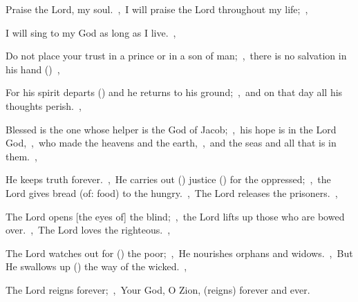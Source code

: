 \documentclass[12pt,twoside,a5paper]{article}
\begin{document}

\begin{normalparskip}
  Praise the Lord, my soul.~\sep\ I will praise the Lord throughout my life;~\sep


  I will sing to my God as long as I live.~\sep

  Do not place your trust in a prince or in a son of man;~\sep\ there is no salvation in his hand ()~\sep

  For his spirit departs () and he returns to his ground;~\sep\ and on that day all his thoughts perish.~\sep

  Blessed is the one whose helper is the God of Jacob;~\sep\ his hope is in the Lord God,~\sep\ who made the heavens and the earth,~\sep\ and the seas and all that is in them.~\sep

  He keeps truth forever.~\sep\ He carries out () justice () for the oppressed;~\sep\ the Lord gives bread (of: food) to the hungry.~\sep\ The Lord releases the prisoners.~\sep

  The Lord opens [the eyes of] the blind;~\sep\ the Lord lifts up those who are bowed over.~\sep\ The Lord loves the righteous.~\sep

  The Lord watches out for () the poor;~\sep\ He nourishes orphans and widows.~\sep\ But He swallows up () the way of the wicked.~\sep

  The Lord reigns forever;~\sep\ Your God, O Zion, (reigns) forever and ever.
\end{normalparskip}

\end{document}
